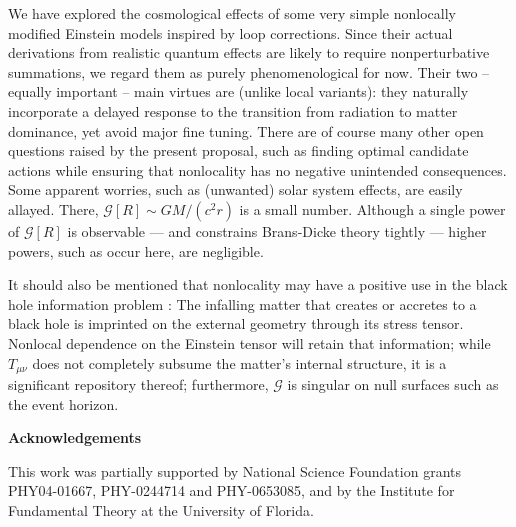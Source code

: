 \documentclass[12pt]{article}
\begin{document}
We have explored the cosmological effects of some very simple nonlocally
modified Einstein models inspired by loop corrections. Since their actual
derivations from realistic quantum effects are likely to require
nonperturbative summations, we regard them as purely phenomenological for
now. Their two -- equally important -- main virtues are (unlike local
variants): they naturally incorporate a delayed response to the transition 
from radiation to matter dominance, yet avoid major fine tuning. There are
of course many other open questions raised by the present proposal, such as
finding optimal candidate actions while ensuring that nonlocality has no
negative unintended consequences. Some apparent worries, such as (unwanted) 
solar system effects, are easily allayed. There, $\mathcal{G}[R] \sim 
GM/(c^2 r)$ is a small number. Although a single power of $\mathcal{G}[R]$
is observable --- and constrains Brans-Dicke theory tightly \cite{Will} 
--- higher powers, such as occur here, are negligible. 

It should also be mentioned that nonlocality may have a positive use in
the black hole information problem \cite{Steve}: The infalling matter
that creates or accretes to a black hole is imprinted on the external 
geometry through its stress tensor. Nonlocal dependence on the Einstein 
tensor will retain that information; while $T_{\mu\nu}$ does not completely
subsume the matter's internal structure, it is a significant repository 
thereof; furthermore, $\mathcal{G}$ is singular on null surfaces such as 
the event horizon.

\vskip 1cm

\centerline{\bf Acknowledgements}

This work was partially supported by National Science Foundation grants
PHY04-01667, PHY-0244714 and PHY-0653085, and by the Institute for
Fundamental Theory at the University of Florida.
\end{document}

